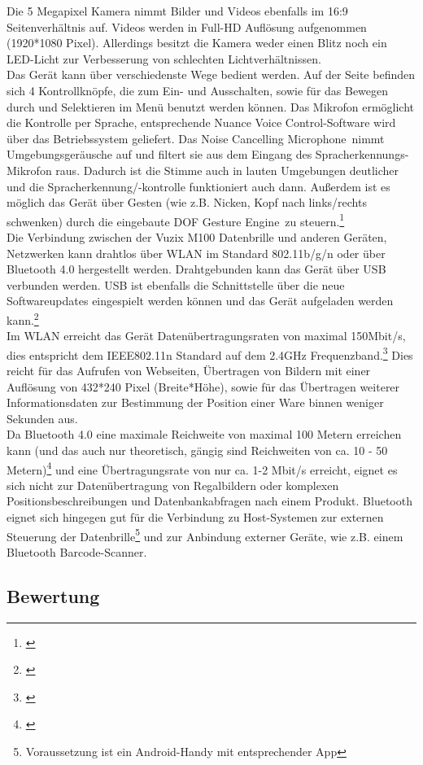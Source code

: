 Die 5 Megapixel Kamera nimmt Bilder und Videos ebenfalls im 16:9 Seitenverhältnis auf. Videos werden in Full-HD Auflösung aufgenommen (1920*1080 Pixel). Allerdings besitzt die Kamera weder einen Blitz noch ein LED-Licht zur Verbesserung von schlechten Lichtverhältnissen.\\

Das Gerät kann über verschiedenste Wege bedient werden. Auf der Seite befinden sich 4 Kontrollknöpfe, die zum Ein- und Ausschalten, sowie für das Bewegen durch und Selektieren im Menü benutzt werden können. Das Mikrofon ermöglicht die Kontrolle per Sprache, entsprechende \glqq Nuance Voice Control\grqq -Software wird über das Betriebssystem geliefert. Das \glqq Noise Cancelling Microphone\grqq\ nimmt Umgebungsgeräusche auf und filtert sie aus dem Eingang des Spracherkennungs-Mikrofon raus. Dadurch ist die Stimme auch in lauten Umgebungen deutlicher und die Spracherkennung/-kontrolle funktioniert auch dann. Außerdem ist es möglich das Gerät über Gesten (wie z.B. Nicken, Kopf nach links/rechts schwenken) durch die eingebaute  DOF Gesture Engine\grqq\ zu steuern.\footnote{\citep{vuzixm100}}\\

Die Verbindung zwischen der Vuzix M100 Datenbrille und anderen Geräten, Netzwerken kann drahtlos über WLAN im Standard 802.11b/g/n oder über Bluetooth 4.0 hergestellt werden. Drahtgebunden kann das Gerät über USB verbunden werden. USB ist ebenfalls die Schnittstelle über die neue Softwareupdates eingespielt werden können und das Gerät aufgeladen werden kann.\footnote{\citep{vuzixm100}}\\
Im WLAN erreicht das Gerät Datenübertragungsraten von maximal 150Mbit/s, dies entspricht dem IEEE802.11n Standard auf dem 2.4GHz Frequenzband.\footnote{\citep{uebertragungsgeschwindigkeit}} Dies reicht für das Aufrufen von Webseiten, Übertragen von Bildern mit einer Auflösung von 432*240 Pixel (Breite*Höhe), sowie für das Übertragen weiterer Informationsdaten zur Bestimmung der Position einer Ware binnen weniger Sekunden aus.\\
Da Bluetooth 4.0 eine maximale Reichweite von maximal 100 Metern erreichen kann (und das auch nur theoretisch, gängig sind Reichweiten von ca. 10 - 50 Metern)\footnote{\citep{bluetooth}} und eine Übertragungsrate von nur ca. 1-2 Mbit/s erreicht, eignet es sich nicht zur Datenübertragung von Regalbildern oder komplexen Positionsbeschreibungen und Datenbankabfragen nach einem Produkt. Bluetooth eignet sich hingegen gut für die Verbindung zu Host-Systemen zur externen Steuerung der Datenbrille\footnote{Voraussetzung ist ein Android-Handy mit entsprechender App} und zur Anbindung externer Geräte, wie z.B. einem Bluetooth Barcode-Scanner.

\subsection{Bewertung}
